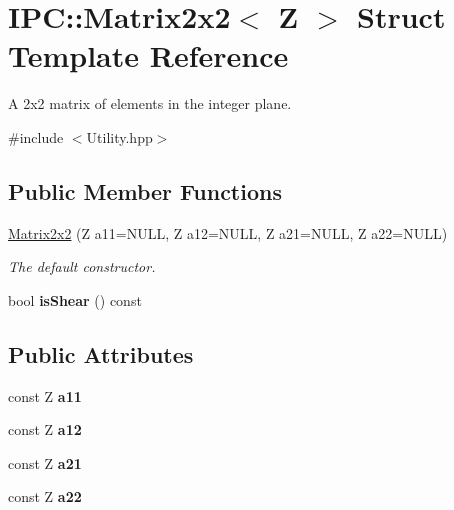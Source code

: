 \hypertarget{struct_i_p_c_1_1_matrix2x2}{}\section{I\+PC\+:\+:Matrix2x2$<$ Z $>$ Struct Template Reference}
\label{struct_i_p_c_1_1_matrix2x2}


A 2x2 matrix of elements in the integer plane.  




{\ttfamily \#include $<$Utility.\+hpp$>$}

\subsection*{Public Member Functions}
\begin{DoxyCompactItemize}
\item 
\hyperlink{struct_i_p_c_1_1_matrix2x2_a1fd0c01c6d3291ee437cae918cfa404a}{Matrix2x2} (Z a11=N\+U\+LL, Z a12=N\+U\+LL, Z a21=N\+U\+LL, Z a22=N\+U\+LL)
\begin{DoxyCompactList}\small\item\em The default constructor. \end{DoxyCompactList}\item 
bool {\bfseries is\+Shear} () const \hypertarget{struct_i_p_c_1_1_matrix2x2_a8b3884894e709f80b14f4505dd7dff15}{}\label{struct_i_p_c_1_1_matrix2x2_a8b3884894e709f80b14f4505dd7dff15}

\end{DoxyCompactItemize}
\subsection*{Public Attributes}
\begin{DoxyCompactItemize}
\item 
const Z {\bfseries a11}\hypertarget{struct_i_p_c_1_1_matrix2x2_abf3dc17b5f340bf96f8485b960fbbfda}{}\label{struct_i_p_c_1_1_matrix2x2_abf3dc17b5f340bf96f8485b960fbbfda}

\item 
const Z {\bfseries a12}\hypertarget{struct_i_p_c_1_1_matrix2x2_ad451989aa77855c396694f651ee4c148}{}\label{struct_i_p_c_1_1_matrix2x2_ad451989aa77855c396694f651ee4c148}

\item 
const Z {\bfseries a21}\hypertarget{struct_i_p_c_1_1_matrix2x2_a327d865824028bb6367df7328401a523}{}\label{struct_i_p_c_1_1_matrix2x2_a327d865824028bb6367df7328401a523}

\item 
const Z {\bfseries a22}\hypertarget{struct_i_p_c_1_1_matrix2x2_a451799432489b93b55196654906528fe}{}\label{struct_i_p_c_1_1_matrix2x2_a451799432489b93b55196654906528fe}

\end{DoxyCompactItemize}


